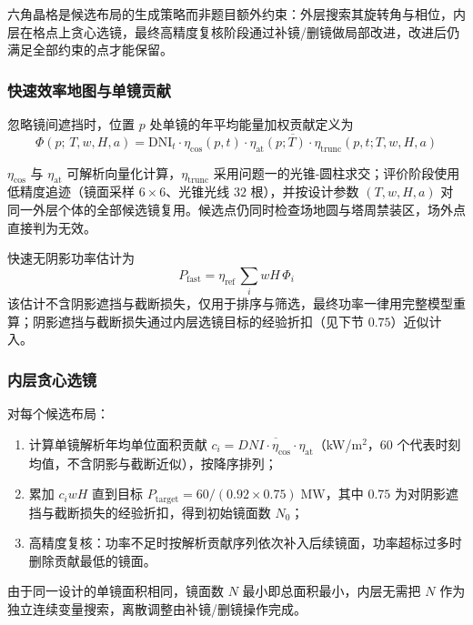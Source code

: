 \documentclass[12pt,a4paper,fontset=fandol]{ctexart}
\begin{document}
六角晶格是候选布局的生成策略而非题目额外约束：外层搜索其旋转角与相位，内层在格点上贪心选镜，最终高精度复核阶段通过补镜/删镜做局部改进，改进后仍满足全部约束的点才能保留。

\subsubsection{快速效率地图与单镜贡献}

忽略镜间遮挡时，位置 $p$ 处单镜的年平均能量加权贡献定义为
\begin{equation}
    \Phi(p;\,T,w,H,a) = \overline{\mathrm{DNI}_t \cdot \eta_{\mathrm{cos}}(p,t) \cdot \eta_{\mathrm{at}}(p;T) \cdot \eta_{\mathrm{trunc}}(p,t;T,w,H,a)}
    \label{eq:q2_phi}
\end{equation}

$\eta_{\mathrm{cos}}$ 与 $\eta_{\mathrm{at}}$ 可解析向量化计算，$\eta_{\mathrm{trunc}}$ 采用问题一的光锥-圆柱求交；评价阶段使用低精度追迹（镜面采样 $6\times6$、光锥光线 $32$ 根），并按设计参数 $(T,w,H,a)$ 对同一外层个体的全部候选镜复用。候选点仍同时检查场地圆与塔周禁装区，场外点直接判为无效。

快速无阴影功率估计为
\begin{equation}
    P_{\mathrm{fast}} = \eta_{\mathrm{ref}} \, \sum_{i} w H \, \Phi_i
    \label{eq:q2_pfast}
\end{equation}
该估计不含阴影遮挡与截断损失，仅用于排序与筛选，最终功率一律用完整模型重算；阴影遮挡与截断损失通过内层选镜目标的经验折扣（见下节 $0.75$）近似计入。

\subsubsection{内层贪心选镜}

对每个候选布局：
\begin{enumerate}
    \item 计算单镜解析年均单位面积贡献 $c_i = \overline{DNI \cdot \eta_{\mathrm{cos}} \cdot \eta_{\mathrm{at}}}$（kW/m$^{2}$，60 个代表时刻均值，不含阴影与截断近似），按降序排列；
    \item 累加 $c_i w H$ 直到目标 $P_{\mathrm{target}} = 60 / (0.92 \times 0.75)\;\mathrm{MW}$，其中 $0.75$ 为对阴影遮挡与截断损失的经验折扣，得到初始镜面数 $N_0$；
    \item 高精度复核：功率不足时按解析贡献序列依次补入后续镜面，功率超标过多时删除贡献最低的镜面。
\end{enumerate}

由于同一设计的单镜面积相同，镜面数 $N$ 最小即总面积最小，内层无需把 $N$ 作为独立连续变量搜索，离散调整由补镜/删镜操作完成。
\end{document}
